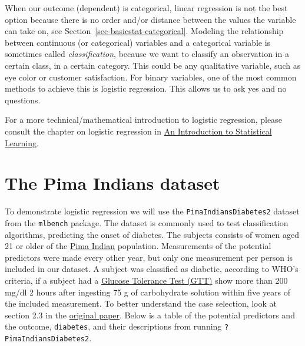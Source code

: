 \documentclass[
  letterpaper,
  DIV=11,
  numbers=noendperiod]{scrreprt}
\begin{document}
When our outcome (dependent) is categorical, linear regression is not
the best option because there is no order and/or distance between the
values the variable can take on, see
Section~\ref{sec-basicstat-categorical}. Modeling the relationship
between continuous (or categorical) variables and a categorical variable
is sometimes called \emph{classification}, because we want to classify
an observation in a certain class, in a certain category. This could be
any qualitative variable, such as eye color or customer satisfaction.
For binary variables, one of the most common methods to achieve this is
logistic regression. This allows us to ask yes and no questions.

For a more technical/mathematical introduction to logistic regression,
please consult the chapter on logistic regression in
\href{https://www.statlearning.com/}{An Introduction to Statistical
Learning}.

\section{The Pima Indians dataset}\label{the-pima-indians-dataset}

To demonstrate logistic regression we will use the
\texttt{PimaIndiansDiabetes2} dataset from the \texttt{mlbench} package.
The dataset is commonly used to test classification algorithms,
predicting the onset of diabetes. The subjects consists of women aged 21
or older of the \href{https://en.wikipedia.org/wiki/Akimel_O'odham}{Pima
Indian} population. Measurements of the potential predictors were made
every other year, but only one measurement per person is included in our
dataset. A subject was classified as diabetic, according to WHO's
criteria, if a subject had a
\href{https://www.ncbi.nlm.nih.gov/books/NBK532915/}{Glucose Tolerance
Test (GTT)} show more than 200 mg/dl 2 hours after ingesting 75 g of
carbohydrate solution within five years of the included measurement. To
better understand the case selection, look at section 2.3 in the
\href{https://www.ncbi.nlm.nih.gov/pmc/articles/PMC2245318/}{original
paper}. Below is a table of the potential predictors and the outcome,
\texttt{diabetes}, and their descriptions from running
\texttt{?PimaIndiansDiabetes2}.
\end{document}
